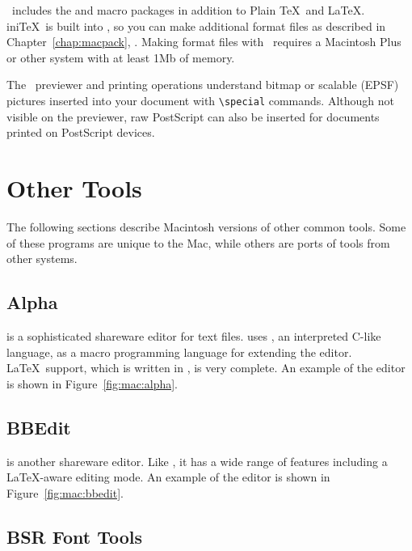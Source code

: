\Textures\ includes the  and  macro
packages in addition to Plain \TeX\ and \LaTeX.  ini\TeX\ is built into
\Textures, so you can make additional format files as described in
Chapter~\ref{chap:macpack}, \textit{}.  Making format files
with \Textures\ requires a Macintosh Plus or other system with at least
1Mb of memory.

The \Textures\ previewer and printing operations understand bitmap or
scalable (EPSF) pictures inserted into your document with
\verb|\special| commands.  Although not visible on the previewer, raw
PostScript can also be inserted for documents printed on PostScript
devices.

\section{Other Tools}

The following sections describe Macintosh versions of other common
tools.  Some of these programs are unique to the Mac, while others
are ports of tools from other systems.

\subsection{Alpha}

 is a sophisticated shareware editor for text files.
 uses , an interpreted C-like
language, as a macro programming language for extending the editor.
\LaTeX\ support, which is written in , is very complete.  
An example of the  editor is shown in 
Figure~\ref{fig:mac:alpha}.


\subsection{BBEdit}

 is another shareware editor.  Like ,
it has a wide range of features including a \LaTeX-aware editing
mode.
An example of the  editor is shown in 
Figure~\ref{fig:mac:bbedit}.


\newpage
\subsection{BSR Font Tools}
\label{sec:bsrtools}

